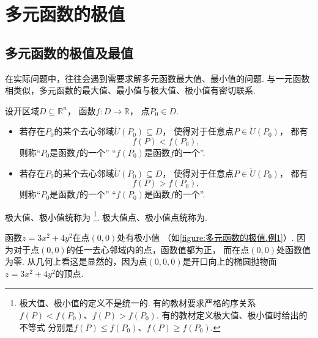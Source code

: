 \section{多元函数的极值}
\subsection{多元函数的极值及最值}
在实际问题中，往往会遇到需要求解多元函数最大值、最小值的问题.
与一元函数相类似，多元函数的最大值、最小值与极大值、极小值有密切联系.

\begin{definition}
设开区域\(D \subseteq \mathbb{R}^n\)，
函数\(f\colon D \to \mathbb{R}\)，
点\(P_0 \in D\).
\begin{itemize}
	\item 若存在\(P_0\)的某个去心邻域\(\mathring{U}(P_0) \subseteq D\)，
	使得对于任意点\(P \in \mathring{U}(P_0)\)，
	都有\[
		f(P) < f(P_0),
	\]
	则称“\(P_0\)是函数\(f\)的一个”
	“\(f(P_0)\)是函数\(f\)的一个”.

	\item 若存在\(P_0\)的某个去心邻域\(\mathring{U}(P_0) \subseteq D\)，
	使得对于任意点\(P \in \mathring{U}(P_0)\)，
	都有\[
		f(P) > f(P_0),
	\]
	则称“\(P_0\)是函数\(f\)的一个”
	“\(f(P_0)\)是函数\(f\)的一个”.
\end{itemize}

极大值、极小值统称为%
\footnote{极大值、极小值的定义不是统一的.
有的教材要求严格的序关系\(f(P) < f(P_0)\)、\(f(P) > f(P_0)\).
有的教材定义极大值、极小值时给出的不等式
分别是\(f(P) \leq f(P_0)\)、\(f(P) \geq f(P_0)\).}.
极大值点、极小值点统称为.
\end{definition}

\begin{example}%
函数\(z=3x^2+4y^2\)在点\((0,0)\)处有极小值
（如\cref{figure:多元函数的极值.例1}）.
因为对于点\((0,0)\)的任一去心邻域内的点，函数值都为正，
而在点\((0,0)\)处函数值为零.
从几何上看这是显然的，因为点\((0,0,0)\)是开口向上的椭圆抛物面\(z=3x^2+4y^2\)的顶点.
\end{example}

